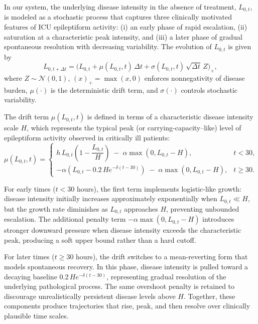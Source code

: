 In our system, the underlying disease intensity in the absence of treatment, $L_{0,t}$, is modeled as a stochastic process that captures three clinically motivated features of ICU epileptiform activity: (i) an early phase of rapid escalation, (ii) saturation at a characteristic peak intensity, and (iii) a later phase of gradual spontaneous resolution with decreasing variability. The evolution of $L_{0,t}$ is given by
\begin{equation}
\label{eq:disease_evolution}
L_{0,t+\Delta t}
=
\Big(
L_{0,t}
+ \mu(L_{0,t}, t)\,\Delta t
+ \sigma(L_{0,t}, t)\,\sqrt{\Delta t}\,Z
\Big)_+,
\end{equation}
where $Z \sim \mathcal{N}(0,1)$, $(x)_+ = \max(x,0)$ enforces nonnegativity of disease burden, $\mu(\cdot)$ is the deterministic drift term, and $\sigma(\cdot)$ controls stochastic variability.

The drift term $\mu(L_{0,t}, t)$ is defined in terms of a characteristic disease intensity scale $H$, which represents the typical peak (or carrying-capacity–like) level of epileptiform activity observed in critically ill patients:
\begin{equation}
\label{eq:disease_drift}
\mu(L_{0,t}, t)
=
\begin{cases}
h\,L_{0,t}\!\left(1 - \dfrac{L_{0,t}}{H}\right)
\;-\;
\alpha \max(0, L_{0,t} - H),
& t < 30, \\[8pt]
-\alpha\!\left(L_{0,t} - 0.2\,H e^{-\delta (t-30)}\right)
\;-\;
\alpha \max(0, L_{0,t} - H),
& t \ge 30 .
\end{cases}
\end{equation}

For early times ($t<30$ hours), the first term implements logistic-like growth: disease intensity initially increases approximately exponentially when $L_{0,t} \ll H$, but the growth rate diminishes as $L_{0,t}$ approaches $H$, preventing unbounded escalation. The additional penalty term $-\alpha \max(0, L_{0,t}-H)$ introduces stronger downward pressure when disease intensity exceeds the characteristic peak, producing a soft upper bound rather than a hard cutoff.

For later times ($t \ge 30$ hours), the drift switches to a mean-reverting form that models spontaneous recovery. In this phase, disease intensity is pulled toward a decaying baseline $0.2\,H e^{-\delta (t-30)}$, representing gradual resolution of the underlying pathological process. The same overshoot penalty is retained to discourage unrealistically persistent disease levels above $H$. Together, these components produce trajectories that rise, peak, and then resolve over clinically plausible time scales.

